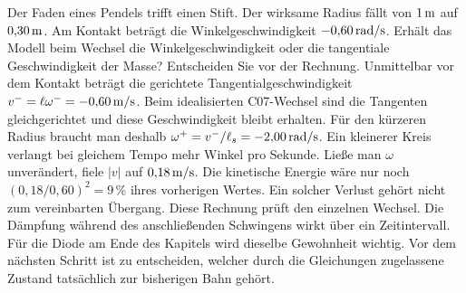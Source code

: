 Der Faden eines Pendels trifft einen Stift. Der wirksame Radius fällt von \(1\,\mathrm{m}\) auf \(0{,}30\,\mathrm{m}\). Am Kontakt beträgt die Winkelgeschwindigkeit \(-0{,}60\,\mathrm{rad/s}\). Erhält das Modell beim Wechsel die Winkelgeschwindigkeit oder die tangentiale Geschwindigkeit der Masse? Entscheiden Sie vor der Rechnung.
Unmittelbar vor dem Kontakt beträgt die gerichtete Tangentialgeschwindigkeit \(v^-=\ell\omega^-=-0{,}60\,\mathrm{m/s}\). Beim idealisierten C07-Wechsel sind die Tangenten gleichgerichtet und diese Geschwindigkeit bleibt erhalten. Für den kürzeren Radius braucht man deshalb \(\omega^+=v^-/\ell_s=-2{,}00\,\mathrm{rad/s}\). Ein kleinerer Kreis verlangt bei gleichem Tempo mehr Winkel pro Sekunde.
Ließe man \(\omega\) unverändert, fiele \(|v|\) auf \(0{,}18\,\mathrm{m/s}\). Die kinetische Energie wäre nur noch \((0{,}18/0{,}60)^2=9\,\%\) ihres vorherigen Wertes. Ein solcher Verlust gehört nicht zum vereinbarten Übergang. Diese Rechnung prüft den einzelnen Wechsel. Die Dämpfung während des anschließenden Schwingens wirkt über ein Zeitintervall.
Für die Diode am Ende des Kapitels wird dieselbe Gewohnheit wichtig. Vor dem nächsten Schritt ist zu entscheiden, welcher durch die Gleichungen zugelassene Zustand tatsächlich zur bisherigen Bahn gehört.


